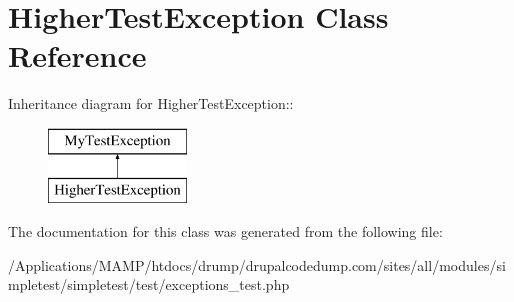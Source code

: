 \hypertarget{class_higher_test_exception}{
\section{HigherTestException Class Reference}
\label{class_higher_test_exception}
}
Inheritance diagram for HigherTestException::\begin{figure}[H]
\begin{center}
\leavevmode
\includegraphics[height=2cm]{class_higher_test_exception}
\end{center}
\end{figure}


The documentation for this class was generated from the following file:\begin{DoxyCompactItemize}
\item 
/Applications/MAMP/htdocs/drump/drupalcodedump.com/sites/all/modules/simpletest/simpletest/test/exceptions\_\-test.php\end{DoxyCompactItemize}
